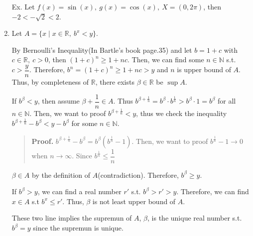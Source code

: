 \documentclass[12pt]{article}
\begin{document}
\begin{enumerate}
    Ex. Let $f(x) = \sin(x),\ g(x) = \cos(x),\ X = (0, 2\pi)$, then $-2 < -\sqrt{2} < 2$.

    \newpage

    \item Let $A = \lbrace x \mid x \in \mathbb{R},\ b^x < y\rbrace$.
    
    By Bernoulli's Inequality(In Bartle's book page.35) and let $b = 1+c$ with $c \in \mathbb{R},\ c > 0$, then $(1+c)^n \geq 1 + nc$.
    Then, we can find some $n \in \mathbb{N}$ s.t. $c > \dfrac{y}{n}$. Therefore, $b^n = (1+c)^n \geq 1+nc > y$ and $n$ is upper bound of $A$. Thus, by completeness of $\mathbb{R}$, there exists $\beta \in \mathbb{R}$ be $\sup A$. 
    
    If $b^\beta < y$, then assume $\beta + \dfrac{1}{n} \in A$. Thus $b^{\beta + \frac{1}{n}} = b^\beta \cdot b^\frac{1}{n} > b^\beta \cdot 1 = b^\beta$ for all $n \in \mathbb{N}$.
    Then, we want to proof $b^{\beta + \frac{1}{n}} < y$, thus we check the inequality $b^{\beta + \frac{1}{n}} - b^\beta < y - b^\beta$ for some $n \in \mathbb{N}$.
    \begin{quote}
        {\bf Proof.} $b^{\beta + \frac{1}{n}} - b^\beta = b^\beta(b^{\frac{1}{n}} - 1)$. Then, we want to proof $b^{\frac{1}{n}} -1 \rightarrow 0$ when $n \rightarrow \infty$.
        Since $b^{\frac{1}{n}} \leq \dfrac{1}{n}$
    \end{quote}
    
    $\beta \in A$ by the definition of $A$(contradiction).
    Therefore, $b^\beta \geq y$.
    
    If $b^\beta > y$,     
    we can find a real number $r'$ s.t. $b^\beta > r' > y$. Therefore, we can find $x \in A$ s.t $b^x \leq r'$. 
    Thus, $\beta$ is not least upper bound of $A$.

    These two line implies the supremun of $A$, $\beta$, is the unique real number s.t. $b^\beta = y$ since the supremun is unique.
\end{enumerate}
\end{document}
